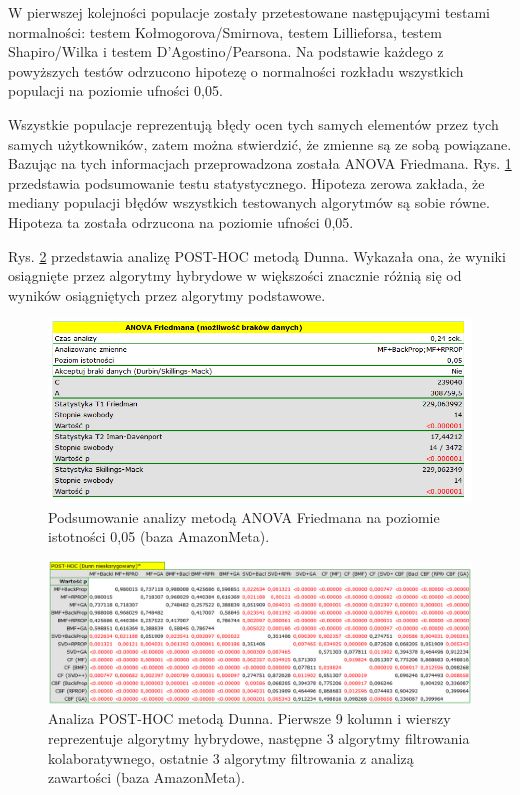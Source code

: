 \documentclass[twoside]{iisthesis}
\begin{document}
		W pierwszej kolejności populacje zostały przetestowane następującymi testami normalności: testem Kołmogorova\-/Smirnova, testem Lillieforsa, testem Shapiro\-/Wilka i testem D'Agostino\-/Pearsona. Na podstawie każdego z powyższych testów odrzucono hipotezę o normalności rozkładu wszystkich populacji na poziomie ufności 0,05. 
		
		Wszystkie populacje reprezentują błędy ocen tych samych elementów przez tych samych użytkowników, zatem można stwierdzić, że zmienne są ze sobą powiązane. Bazując na tych informacjach przeprowadzona została ANOVA Friedmana. Rys. \ref{fig:friedman2} przedstawia podsumowanie testu statystycznego. Hipoteza zerowa zakłada, że mediany populacji błędów wszystkich testowanych algorytmów są sobie równe. Hipoteza ta została odrzucona na poziomie ufności 0,05.
		
		Rys. \ref{fig:friedman1} przedstawia analizę POST-HOC metodą Dunna. Wykazała ona, że wyniki osiągnięte przez algorytmy hybrydowe w większości znacznie różnią się od wyników osiągniętych przez algorytmy podstawowe. 
		
		\begin{figure}[!ht]
			\centering
			\includegraphics[width=1\textwidth]{friedman2}	
			\caption{Podsumowanie analizy metodą ANOVA Friedmana na poziomie istotności 0,05 (baza AmazonMeta).}
			\label{fig:friedman2}
		\end{figure}
		
		\begin{figure}
			\centering
			\includegraphics[width=1\textwidth]{friedman1}	
			\caption{Analiza POST-HOC metodą Dunna. Pierwsze 9 kolumn i wierszy reprezentuje algorytmy hybrydowe, następne 3 algorytmy filtrowania kolaboratywnego, ostatnie 3 algorytmy filtrowania z analizą zawartości (baza AmazonMeta).}
			\label{fig:friedman1}
		\end{figure}
		
\end{document}
